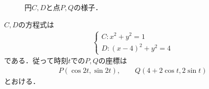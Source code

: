 \documentclass[../../main.tex]{subfiles}
\begin{document}
\begin{figure}[htb]
\begin{center}
    \caption{円$C, D$と点$P, Q$の様子．}
  \end{center}
\end{figure}

$C,D$の方程式は
\begin{align}
  \begin{cases}
    C: x^2+y^2=1 \\
    D: (x-4)^2+y^2=4
  \end{cases}
\end{align}
である．従って時刻$t$での$P,Q$の座標は
\begin{align}
  P(\cos2t,\sin2t), \qquad Q(4+2\cos t,2\sin t) \label{eq:1}
\end{align}
とおける．
\end{document}

